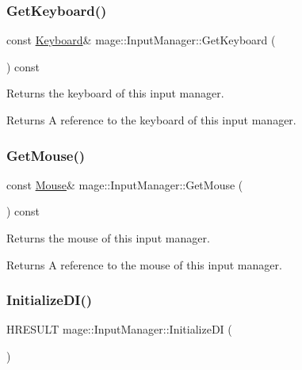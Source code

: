 \subsubsection{\texorpdfstring{Get\+Keyboard()}{GetKeyboard()}}
{\footnotesize\ttfamily const \hyperlink{classmage_1_1_keyboard}{Keyboard}\& mage\+::\+Input\+Manager\+::\+Get\+Keyboard (\begin{DoxyParamCaption}{ }\end{DoxyParamCaption}) const}

Returns the keyboard of this input manager.

\begin{DoxyReturn}{Returns}
A reference to the keyboard of this input manager. 
\end{DoxyReturn}
\hypertarget{classmage_1_1_input_manager_a79f8294128ccd710ad80571483377067}{}\label{classmage_1_1_input_manager_a79f8294128ccd710ad80571483377067} 
\subsubsection{\texorpdfstring{Get\+Mouse()}{GetMouse()}}
{\footnotesize\ttfamily const \hyperlink{classmage_1_1_mouse}{Mouse}\& mage\+::\+Input\+Manager\+::\+Get\+Mouse (\begin{DoxyParamCaption}{ }\end{DoxyParamCaption}) const}

Returns the mouse of this input manager.

\begin{DoxyReturn}{Returns}
A reference to the mouse of this input manager. 
\end{DoxyReturn}
\hypertarget{classmage_1_1_input_manager_af3ca0717e37916463cc4f40c7d174b33}{}\label{classmage_1_1_input_manager_af3ca0717e37916463cc4f40c7d174b33} 
\subsubsection{\texorpdfstring{Initialize\+D\+I()}{InitializeDI()}}
{\footnotesize\ttfamily H\+R\+E\+S\+U\+LT mage\+::\+Input\+Manager\+::\+Initialize\+DI (\begin{DoxyParamCaption}{ }\end{DoxyParamCaption})\hspace{0.3cm}{\ttfamily [protected]}}

